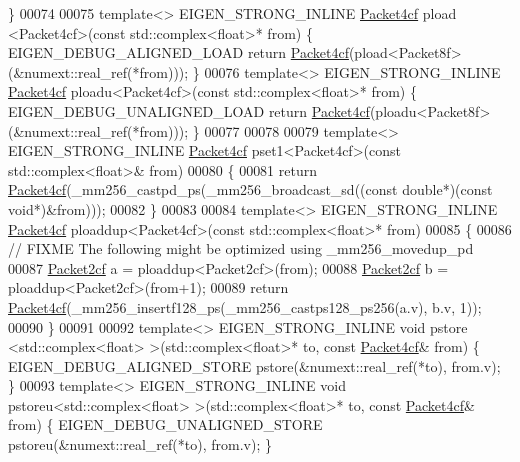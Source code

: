 \begin{DoxyCode}
       \}
00074 
00075 \textcolor{keyword}{template}<> EIGEN\_STRONG\_INLINE \hyperlink{struct_eigen_1_1internal_1_1_packet4cf}{Packet4cf} pload <Packet4cf>(\textcolor{keyword}{const} std::complex<float>* from) \{ 
      EIGEN\_DEBUG\_ALIGNED\_LOAD \textcolor{keywordflow}{return} \hyperlink{struct_eigen_1_1internal_1_1_packet4cf}{Packet4cf}(pload<Packet8f>(&numext::real\_ref(*from))); \}
00076 \textcolor{keyword}{template}<> EIGEN\_STRONG\_INLINE \hyperlink{struct_eigen_1_1internal_1_1_packet4cf}{Packet4cf} ploadu<Packet4cf>(\textcolor{keyword}{const} std::complex<float>* from) \{ 
      EIGEN\_DEBUG\_UNALIGNED\_LOAD \textcolor{keywordflow}{return} \hyperlink{struct_eigen_1_1internal_1_1_packet4cf}{Packet4cf}(ploadu<Packet8f>(&numext::real\_ref(*from))); \}
00077 
00078 
00079 \textcolor{keyword}{template}<> EIGEN\_STRONG\_INLINE \hyperlink{struct_eigen_1_1internal_1_1_packet4cf}{Packet4cf} pset1<Packet4cf>(\textcolor{keyword}{const} std::complex<float>& from)
00080 \{
00081   \textcolor{keywordflow}{return} \hyperlink{struct_eigen_1_1internal_1_1_packet4cf}{Packet4cf}(\_mm256\_castpd\_ps(\_mm256\_broadcast\_sd((\textcolor{keyword}{const} \textcolor{keywordtype}{double}*)(\textcolor{keyword}{const} \textcolor{keywordtype}{void}*)&from)));
00082 \}
00083 
00084 \textcolor{keyword}{template}<> EIGEN\_STRONG\_INLINE \hyperlink{struct_eigen_1_1internal_1_1_packet4cf}{Packet4cf} ploaddup<Packet4cf>(\textcolor{keyword}{const} std::complex<float>* from)
00085 \{
00086   \textcolor{comment}{// FIXME The following might be optimized using \_mm256\_movedup\_pd}
00087   \hyperlink{struct_eigen_1_1internal_1_1_packet2cf}{Packet2cf} a = ploaddup<Packet2cf>(from);
00088   \hyperlink{struct_eigen_1_1internal_1_1_packet2cf}{Packet2cf} b = ploaddup<Packet2cf>(from+1);
00089   \textcolor{keywordflow}{return}  \hyperlink{struct_eigen_1_1internal_1_1_packet4cf}{Packet4cf}(\_mm256\_insertf128\_ps(\_mm256\_castps128\_ps256(a.v), b.v, 1));
00090 \}
00091 
00092 \textcolor{keyword}{template}<> EIGEN\_STRONG\_INLINE \textcolor{keywordtype}{void} pstore <std::complex<float> >(std::complex<float>* to, \textcolor{keyword}{const} 
      \hyperlink{struct_eigen_1_1internal_1_1_packet4cf}{Packet4cf}& from) \{ EIGEN\_DEBUG\_ALIGNED\_STORE pstore(&numext::real\_ref(*to), from.v); \}
00093 \textcolor{keyword}{template}<> EIGEN\_STRONG\_INLINE \textcolor{keywordtype}{void} pstoreu<std::complex<float> >(std::complex<float>* to, \textcolor{keyword}{const} 
      \hyperlink{struct_eigen_1_1internal_1_1_packet4cf}{Packet4cf}& from) \{ EIGEN\_DEBUG\_UNALIGNED\_STORE pstoreu(&numext::real\_ref(*to), from.v); \}

\end{DoxyCode}
